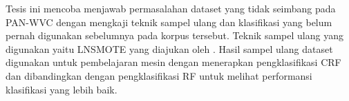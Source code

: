 Tesis ini mencoba menjawab permasalahan dataset yang tidak seimbang pada
PAN-WVC dengan mengkaji teknik sampel ulang dan klasifikasi yang belum pernah
digunakan sebelumnya pada korpus tersebut.
Teknik sampel ulang yang digunakan yaitu LNSMOTE yang diajukan oleh
\textcite{maciejewski2011local}.
Hasil sampel ulang dataset digunakan untuk pembelajaran mesin dengan menerapkan
pengklasifikasi CRF dan dibandingkan dengan pengklasifikasi RF untuk melihat
performansi klasifikasi yang lebih baik.
